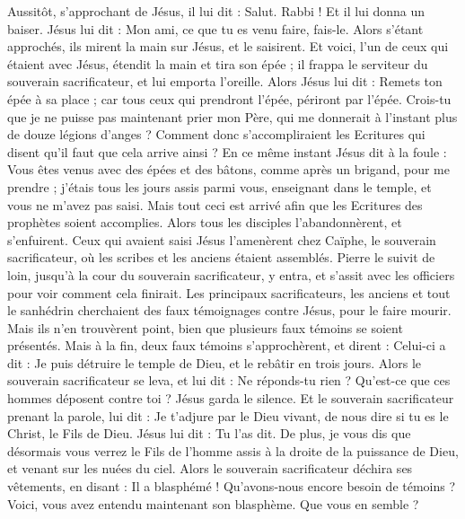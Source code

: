 \begin{multicols}{2}
Aussitôt, s'approchant de Jésus, il lui dit : Salut. Rabbi ! Et il lui donna un baiser.
Jésus lui dit : Mon ami, ce que tu es venu faire, fais-le. Alors s'étant approchés, ils mirent la main sur Jésus, et le saisirent.
Et voici, l'un de ceux qui étaient avec Jésus, étendit la main et tira son épée ; il frappa le serviteur du souverain sacrificateur, et lui emporta l'oreille.
Alors Jésus lui dit : Remets ton épée à sa place ; car tous ceux qui prendront l'épée, périront par l'épée.
Crois-tu que je ne puisse pas maintenant prier mon Père, qui me donnerait à l’instant plus de douze légions d'anges ?
Comment donc s’accompliraient les Ecritures qui disent qu'il faut que cela arrive ainsi ?
En ce même instant Jésus dit à la foule : Vous êtes venus avec des épées et des bâtons, comme après un brigand, pour me prendre ; j'étais tous les jours assis parmi vous, enseignant dans le temple, et vous ne m'avez pas saisi.
Mais tout ceci est arrivé afin que les Ecritures des prophètes soient accomplies. Alors tous les disciples l'abandonnèrent, et s'enfuirent.
Ceux qui avaient saisi Jésus l'amenèrent chez Caïphe, le souverain sacrificateur, où les scribes et les anciens étaient assemblés.
Pierre le suivit de loin, jusqu’à la cour du souverain sacrificateur, y entra, et s’assit avec les officiers pour voir comment cela finirait.
Les principaux sacrificateurs, les anciens et tout le sanhédrin cherchaient des faux témoignages contre Jésus, pour le faire mourir.
Mais ils n'en trouvèrent point, bien que plusieurs faux témoins se soient présentés. Mais à la fin, deux faux témoins s'approchèrent,
et dirent : Celui-ci a dit : Je puis détruire le temple de Dieu, et le rebâtir en trois jours.
Alors le souverain sacrificateur se leva, et lui dit : Ne réponds-tu rien ? Qu’est-ce que ces hommes déposent contre toi ?
Jésus garda le silence. Et le souverain sacrificateur prenant la parole, lui dit : Je t’adjure par le Dieu vivant, de nous dire si tu es le Christ, le Fils de Dieu.
Jésus lui dit : Tu l'as dit. De plus, je vous dis que désormais vous verrez le Fils de l'homme assis à la droite de la puissance de Dieu, et venant sur les nuées du ciel.
Alors le souverain sacrificateur déchira ses vêtements, en disant : Il a blasphémé ! Qu’avons-nous encore besoin de témoins ? Voici, vous avez entendu maintenant son blasphème. Que vous en semble ?

\end{multicols}
